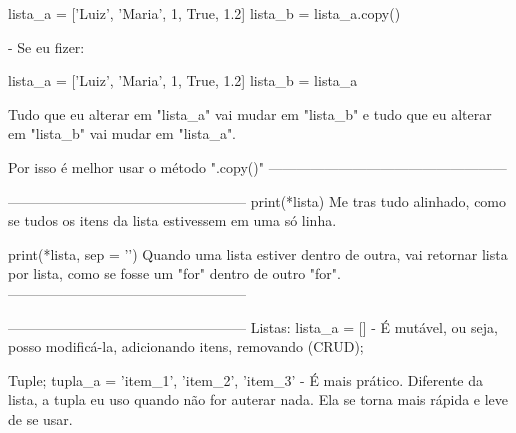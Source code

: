 lista_a = ['Luiz', 'Maria', 1, True, 1.2]
lista_b = lista_a.copy()

- Se eu fizer:

lista_a = ['Luiz', 'Maria', 1, True, 1.2]
lista_b = lista_a

Tudo que eu alterar em "lista_a" vai mudar em "lista_b"
e tudo que eu alterar em "lista_b" vai mudar em "lista_a".

Por isso é melhor usar o método ".copy()"
---------------------------------------------------


---------------------------------------------------
print(*lista)
Me tras tudo alinhado, como se tudos os itens da lista
estivessem em uma só linha.

print(*lista, sep = '\n')
Quando uma lista estiver dentro de outra, vai retornar
lista por lista, como se fosse um "for" dentro
de outro "for".
---------------------------------------------------


---------------------------------------------------
Listas:
lista_a = []
- É mutável, ou seja, posso modificá-la, adicionando itens, removando (CRUD);

Tuple;
tupla_a = 'item_1', 'item_2', 'item_3'
- É mais prático. Diferente da lista, a tupla eu uso quando não for auterar nada.
Ela se torna mais rápida e leve de se usar. 